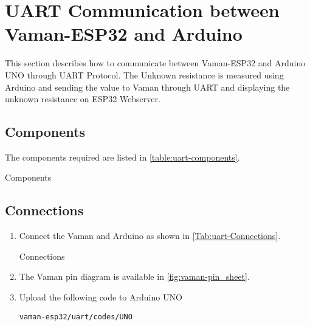 \section{UART Communication between Vaman-ESP32 and Arduino}
This section describes how to communicate between Vaman-ESP32 and Arduino UNO 
through UART Protocol. The Unknown resistance is measured using Arduino and 
sending the value to Vaman through UART and displaying the unknown resistance on
ESP32 Webserver.
\subsection{Components}
The components required are listed in \autoref{table:uart-components}.
\begin{table}[!ht]
\centering

\caption{Components}
\label{table:uart-components}
\end{table}

\subsection{Connections}
\begin{enumerate}
\item
Connect the Vaman and Arduino as shown in \autoref{Tab:uart-Connections}.

\begin{table}[!ht]
\centering

\caption{Connections}
\label{Tab:uart-Connections}
\end{table}
\item
The Vaman pin diagram is available in \autoref{fig:vaman-pin_sheet}.

\item Upload the following code to Arduino UNO

\begin{lstlisting}
vaman-esp32/uart/codes/UNO
\end{lstlisting}
\end{enumerate}
